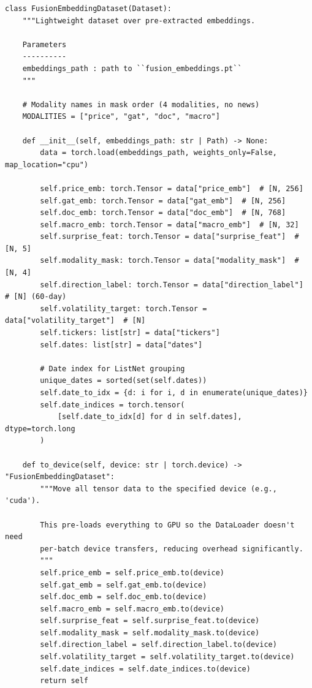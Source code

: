 \documentclass[12pt,a4paper]{article}
\begin{document}
\begin{lstlisting}[caption={Fusion dataset masking (src/data/fusion\_dataset.py)}]
class FusionEmbeddingDataset(Dataset):
    """Lightweight dataset over pre-extracted embeddings.

    Parameters
    ----------
    embeddings_path : path to ``fusion_embeddings.pt``
    """

    # Modality names in mask order (4 modalities, no news)
    MODALITIES = ["price", "gat", "doc", "macro"]

    def __init__(self, embeddings_path: str | Path) -> None:
        data = torch.load(embeddings_path, weights_only=False, map_location="cpu")

        self.price_emb: torch.Tensor = data["price_emb"]  # [N, 256]
        self.gat_emb: torch.Tensor = data["gat_emb"]  # [N, 256]
        self.doc_emb: torch.Tensor = data["doc_emb"]  # [N, 768]
        self.macro_emb: torch.Tensor = data["macro_emb"]  # [N, 32]
        self.surprise_feat: torch.Tensor = data["surprise_feat"]  # [N, 5]
        self.modality_mask: torch.Tensor = data["modality_mask"]  # [N, 4]
        self.direction_label: torch.Tensor = data["direction_label"]  # [N] (60-day)
        self.volatility_target: torch.Tensor = data["volatility_target"]  # [N]
        self.tickers: list[str] = data["tickers"]
        self.dates: list[str] = data["dates"]

        # Date index for ListNet grouping
        unique_dates = sorted(set(self.dates))
        self.date_to_idx = {d: i for i, d in enumerate(unique_dates)}
        self.date_indices = torch.tensor(
            [self.date_to_idx[d] for d in self.dates], dtype=torch.long
        )

    def to_device(self, device: str | torch.device) -> "FusionEmbeddingDataset":
        """Move all tensor data to the specified device (e.g., 'cuda').

        This pre-loads everything to GPU so the DataLoader doesn't need
        per-batch device transfers, reducing overhead significantly.
        """
        self.price_emb = self.price_emb.to(device)
        self.gat_emb = self.gat_emb.to(device)
        self.doc_emb = self.doc_emb.to(device)
        self.macro_emb = self.macro_emb.to(device)
        self.surprise_feat = self.surprise_feat.to(device)
        self.modality_mask = self.modality_mask.to(device)
        self.direction_label = self.direction_label.to(device)
        self.volatility_target = self.volatility_target.to(device)
        self.date_indices = self.date_indices.to(device)
        return self


\end{lstlisting}
\end{document}
